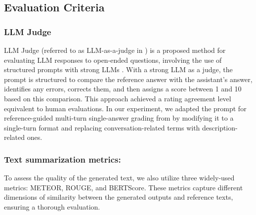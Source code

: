\vspace{-5pt}
\subsection{Evaluation Criteria}
\label{sec:eval}
\subsubsection{LLM Judge}
LLM Judge (referred to as LLM-as-a-judge in \cite{zheng2023llmjudging}) is a proposed method for evaluating LLM responses to open-ended questions, involving the use of structured prompts with strong LLMs \cite{zheng2023llmjudging}. 
With a strong LLM as a judge, the prompt is structured to compare the reference answer with the assistant's answer, identifies any errors, corrects them, and then assigns a score between 1 and 10 based on this comparison.
This approach achieved a rating agreement level equivalent to human evaluations.
In our experiment, we adapted the prompt for reference-guided multi-turn single-answer grading from \cite{zheng2023llmjudging} by modifying it to a single-turn format and replacing conversation-related terms with description-related ones.


\subsubsection{Text summarization metrics: }
To assess the quality of the generated text, we also utilize three widely-used metrics: METEOR\cite{banerjee2005meteor}, ROUGE\cite{lin2004rouge}, and BERTScore\cite{zhang2019bertscore}. These metrics capture different dimensions of similarity between the generated outputs and reference texts, ensuring a thorough evaluation.
